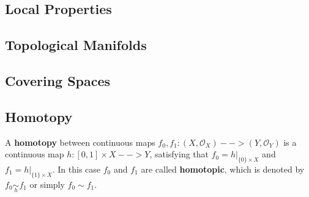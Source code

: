 \subsection{Local Properties}
\subsection{Topological Manifolds}
\subsection{Covering Spaces}
\subsection{Homotopy}

\begin{definition}
	A \textbf{homotopy} between continuous maps $f_0,f_1: (X, \mathcal{O}_X) --> (Y,\mathcal{O}_Y)$ is a continuous map $h:[0,1]\times X --> Y$, satisfying that $f_0 = h|_{\{0\}\times X}$ and $f_1 = h|_{\{1\}\times X}$. In this case $f_0$ and $f_1$ are called \textbf{homotopic}, which is denoted by $f_0 \underset{h}{\sim} f_1$ or simply $f_0 \sim f_1$.


\end{definition}
